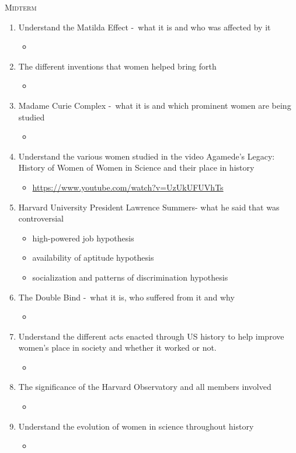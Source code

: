 \documentclass[11pt,a4paper]{article}
\begin{document}
  \begin{center}
    \textsc{\LARGE Midterm}
  \end{center}
  \begin{enumerate}
    \item Understand the Matilda Effect -\ what it is and who was affected by it
    \begin{itemize}
      \item 
    \end{itemize}
    \item The different inventions that women helped bring forth
    \begin{itemize}
      \item 
    \end{itemize}
    \item Madame Curie Complex -\ what it is and which prominent women are being studied
    \begin{itemize}
      \item 
    \end{itemize}
    \item Understand the various women studied in the video Agamede’s Legacy: History of Women of Women in Science and their place in history
    \begin{itemize}
      \item \url{https://www.youtube.com/watch?v=UzUkUFUVhTs}
    \end{itemize}
    \item Harvard University President Lawrence Summers- what he said that was controversial
    \begin{itemize}
      \item high-powered job hypothesis
      \item availability of aptitude hypothesis
      \item socialization and patterns of discrimination hypothesis
    \end{itemize}
    \item The Double Bind -\ what it is, who suffered from it and why
    \begin{itemize}
      \item 
    \end{itemize}
    \item Understand the different acts enacted through US history to help improve women’s place in society and whether it worked or not.
    \begin{itemize}
      \item 
    \end{itemize}
    \item The significance of the Harvard Observatory and all members involved
    \begin{itemize}
      \item 
    \end{itemize}
    \item Understand the evolution of women in science throughout history
    \begin{itemize}
      \item 
    \end{itemize}
  \end{enumerate}
\end{document}
